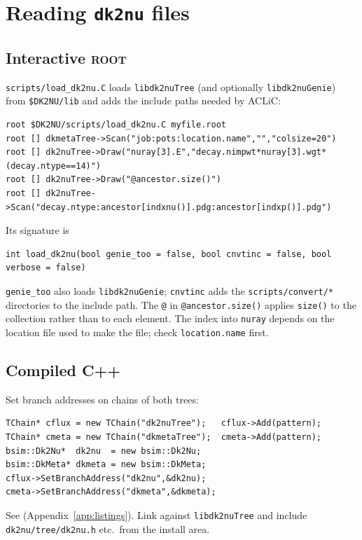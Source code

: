 \documentclass[11pt]{article}
\newcommand{\code}[1]{\texttt{#1}}
\newcommand{\ROOT}{\textsc{root}\xspace}
\newcommand{\dktwonu}{\texttt{dk2nu}\xspace}
\newcommand{\app}[1]{Appendix~\ref{app:#1}}
\begin{document}
\section{Reading \dktwonu files}\label{sec:read}

\subsection{Interactive \ROOT}

\code{scripts/load\_dk2nu.C} loads \code{libdk2nuTree} (and optionally
\code{libdk2nuGenie}) from \code{\$DK2NU/lib} and adds the include paths
needed by ACLiC:
\begin{lstlisting}[style=plain]
root $DK2NU/scripts/load_dk2nu.C myfile.root
root [] dkmetaTree->Scan("job:pots:location.name","","colsize=20")
root [] dk2nuTree->Draw("nuray[3].E","decay.nimpwt*nuray[3].wgt*(decay.ntype==14)")
root [] dk2nuTree->Draw("@ancestor.size()")
root [] dk2nuTree->Scan("decay.ntype:ancestor[indxnu()].pdg:ancestor[indxp()].pdg")
\end{lstlisting}
Its signature is
\begin{lstlisting}[style=cxx,numbers=none]
int load_dk2nu(bool genie_too = false, bool cnvtinc = false, bool verbose = false)
\end{lstlisting}
\code{genie\_too} also loads \code{libdk2nuGenie}; \code{cnvtinc} adds the
\code{scripts/convert/*} directories to the include path.  The \code{@} in
\code{@ancestor.size()} applies \code{size()} to the collection rather than
to each element.  The index into \code{nuray} depends on the location file
used to make the file; check \code{location.name} first.

\subsection{Compiled C++}

Set branch addresses on chains of both trees:
\begin{lstlisting}[style=cxx,numbers=none]
TChain* cflux = new TChain("dk2nuTree");   cflux->Add(pattern);
TChain* cmeta = new TChain("dkmetaTree");  cmeta->Add(pattern);
bsim::Dk2Nu*  dk2nu  = new bsim::Dk2Nu;
bsim::DkMeta* dkmeta = new bsim::DkMeta;
cflux->SetBranchAddress("dk2nu",&dk2nu);
cmeta->SetBranchAddress("dkmeta",&dkmeta);
\end{lstlisting}
See  (\app{listings}).  Link
against \code{libdk2nuTree} and include \code{dk2nu/tree/dk2nu.h} etc.\
from the install area.
\end{document}
